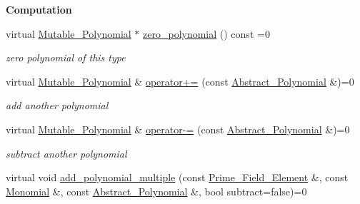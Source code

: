 \begin{Indent}\textbf{ Computation}\par
\begin{DoxyCompactItemize}
\item 
\mbox{\label{group__polygroup_aa7a14a4cbb110840e55d656d7c6fe3ff}} 
virtual \hyperlink{group__polygroup_class_mutable___polynomial}{Mutable\+\_\+\+Polynomial} $\ast$ \hyperlink{group__polygroup_aa7a14a4cbb110840e55d656d7c6fe3ff}{zero\+\_\+polynomial} () const =0
\begin{DoxyCompactList}\small\item\em zero polynomial of this type \end{DoxyCompactList}\item 
\mbox{\label{group__polygroup_a4d581c9c777591ab2cfdb3b4139c21da}} 
virtual \hyperlink{group__polygroup_class_mutable___polynomial}{Mutable\+\_\+\+Polynomial} \& \hyperlink{group__polygroup_a4d581c9c777591ab2cfdb3b4139c21da}{operator+=} (const \hyperlink{group__polygroup_class_abstract___polynomial}{Abstract\+\_\+\+Polynomial} \&)=0
\begin{DoxyCompactList}\small\item\em add another polynomial \end{DoxyCompactList}\item 
\mbox{\label{group__polygroup_a6582d3b7af8a58f9645aac72fec01614}} 
virtual \hyperlink{group__polygroup_class_mutable___polynomial}{Mutable\+\_\+\+Polynomial} \& \hyperlink{group__polygroup_a6582d3b7af8a58f9645aac72fec01614}{operator-\/=} (const \hyperlink{group__polygroup_class_abstract___polynomial}{Abstract\+\_\+\+Polynomial} \&)=0
\begin{DoxyCompactList}\small\item\em subtract another polynomial \end{DoxyCompactList}\item 
\mbox{\label{group__polygroup_add21309f55af6a58e1d9b1623a0bb09a}} 
virtual void \hyperlink{group__polygroup_add21309f55af6a58e1d9b1623a0bb09a}{add\+\_\+polynomial\+\_\+multiple} (const \hyperlink{group___fields_group_class_prime___field___element}{Prime\+\_\+\+Field\+\_\+\+Element} \&, const \hyperlink{group__polygroup_class_monomial}{Monomial} \&, const \hyperlink{group__polygroup_class_abstract___polynomial}{Abstract\+\_\+\+Polynomial} \&, bool subtract=false)=0

\end{DoxyCompactItemize}
\end{Indent}
